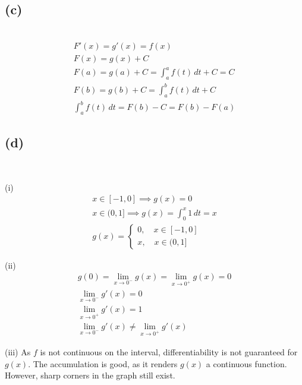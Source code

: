 \documentclass[12pt]{article}
\newcommand{\vem}{\vspace{0.5em}}
\newcommand{\subproblem}[1]{\subsection{(#1)} \,}
\begin{document}
\subproblem{c}
\begin{gather*}
    F'(x)=g'(x)=f(x)\\
    F(x)=g(x)+C\\
    F(a)=g(a)+C=\int_a^a f(t)\, dt+C=C\\
    F(b)=g(b)+C=\int_a^b f(t)\, dt+C\\
    \int_a^b f(t)\, dt=F(b)-C=F(b)-F(a)
\end{gather*}

\subproblem{d}

\vem
(i)
\begin{gather*}
    x \in [-1,0] \implies g(x)=0\\
    x\in (0,1] \implies g(x)=\int_0^x 1\, dt=x\\
    g(x)=\begin{cases}
        0,\quad x\in [-1,0]\\
        x, \quad x\in (0,1]
    \end{cases}
\end{gather*}

(ii)
\begin{gather*}
    g(0)=\lim_{x\to 0^-} g(x)=\lim_{x\to 0^+} g(x)=0\\
    \lim_{x\to 0^-} g'(x)=0\\
    \lim_{x\to 0^+} g'(x)=1\\
    \lim_{x\to 0^-} g'(x) \ne \lim_{x\to 0^+} g'(x)
\end{gather*}

(iii)
As $f$ is not continuous on the interval, differentiability is not guaranteed for $g(x)$. The accumulation is good, as it renders $g(x)$ a continuous function. However, sharp corners in the graph still exist.
\end{document}
